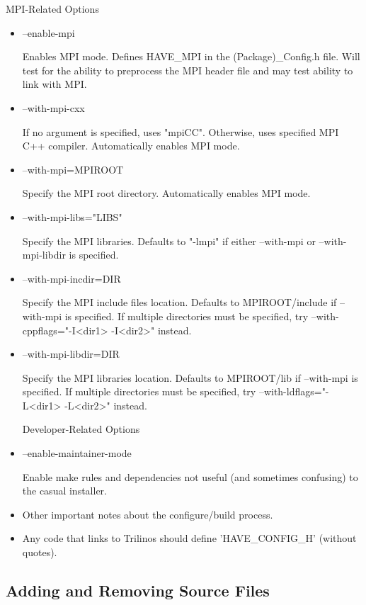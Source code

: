 \documentclass[12pt,relax]{SANDreport}
\begin{document}
MPI-Related Options

\begin{itemize}
\item --enable-mpi 

Enables MPI mode. Defines HAVE\_MPI in the (Package)\_Config.h file. Will test 
for the ability to preprocess the MPI header file and may test ability to link 
with MPI.

\item --with-mpi-cxx 

If no argument is specified, uses "mpiCC". Otherwise, uses specified MPI C++
compiler. Automatically enables MPI mode. 

\item --with-mpi=MPIROOT 

Specify the MPI root directory. Automatically enables MPI mode. 

\item --with-mpi-libs="LIBS" 

Specify the MPI libraries. Defaults to "-lmpi" if either --with-mpi or 
--with-mpi-libdir is specified.

\item --with-mpi-incdir=DIR

Specify the MPI include files location. Defaults to MPIROOT/include if 
--with-mpi is specified. If multiple directories  must be specified, try 
--with-cppflags="-I<dir1> -I<dir2>" instead.

\item --with-mpi-libdir=DIR 

Specify the MPI libraries location. Defaults to MPIROOT/lib if --with-mpi 
is specified. If multiple directories must be specified, try 
--with-ldflags="-L<dir1> -L<dir2>" instead. 

Developer-Related Options

\item --enable-maintainer-mode 

Enable make rules and dependencies not useful (and sometimes confusing) to 
the casual installer.

\item Other important notes about the configure/build process.

\item Any code that links to Trilinos should define 'HAVE\_CONFIG\_H' (without
quotes).
\end{itemize}

\subsection{Adding and Removing Source Files}
\end{document}
